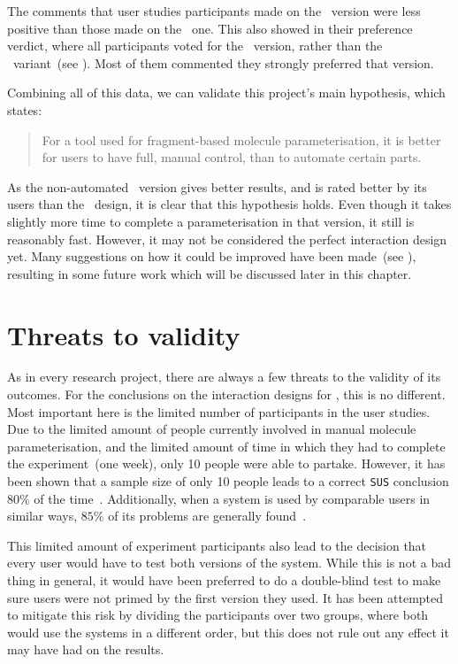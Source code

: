 The comments that user studies participants made on the \IDb\ version were less positive than those made on the \IDa\ one. This also showed in their preference verdict, where all participants voted for the \IDa\ version, rather than the \IDb\ variant~(see ). Most of them commented they strongly preferred that version.

Combining all of this data, we can validate this project's main hypothesis, which states:
\begin{quote}
For a tool used for fragment-based molecule parameterisation, it is better for users to have full, manual control, than to automate certain parts.
\end{quote}
As the non-automated \IDa\ version gives better results, and is rated better by its users than the \IDb\ design, it is clear that this hypothesis holds. Even though it takes slightly more time to complete a parameterisation in that version, it still is reasonably fast. However, it may not be considered the perfect interaction design yet. Many suggestions on how it could be improved have been made~(see ), resulting in some future work which will be discussed later in this chapter.



\section{Threats to validity}
As in every research project, there are always a few threats to the validity of its outcomes. For the conclusions on the interaction designs for \oframp, this is no different. Most important here is the limited number of participants in the user studies. Due to the limited amount of people currently involved in manual molecule parameterisation, and the limited amount of time in which they had to complete the experiment~(one week), only 10 people were able to partake. However, it has been shown that a sample size of only 10 people leads to a correct \verb|SUS| conclusion $80\%$ of the time~\cite{tullis2004comparison}. Additionally, when a system is used by comparable users in similar ways, $85\%$ of its problems are generally found~\cite{nielsen2000you}.

This limited amount of experiment participants also lead to the decision that every user would have to test both versions of the system. While this is not a bad thing in general, it would have been preferred to do a double-blind test to make sure users were not primed by the first version they used. It has been attempted to mitigate this risk by dividing the participants over two groups, where both would use the systems in a different order, but this does not rule out any effect it may have had on the results.

